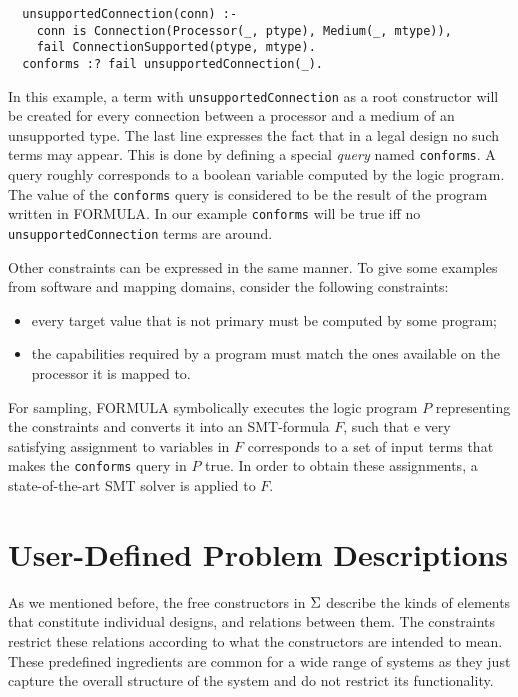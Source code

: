 \documentclass[conference]{IEEEtran}
\newcommand{\FORMULA}{FORMULA}%
\begin{document}
{\scriptsize\begin{verbatim}
  unsupportedConnection(conn) :- 
    conn is Connection(Processor(_, ptype), Medium(_, mtype)), 
    fail ConnectionSupported(ptype, mtype).
  conforms :? fail unsupportedConnection(_).
\end{verbatim}}

In this example, a term with \texttt{unsupportedConnection} as a root constructor will be created for every connection between a processor and a medium of an unsupported type. The last line expresses the fact that in a legal design no such terms may appear. This is done by defining a special \emph{query} named \texttt{conforms}. A query roughly corresponds to a boolean variable computed by the logic program. The value of the \texttt{conforms} query is considered to be the result of the program written in \FORMULA{}. In our example \texttt{conforms} will be true iff no  \texttt{unsupportedConnection} terms are around.

Other constraints can be expressed in the same manner. To give some examples from software and mapping domains, consider the following constraints:
\begin{itemize}
  \item every target value that is not primary must be computed by some program;
  \item the capabilities required by a program must match the ones available on the processor it is mapped to.
\end{itemize}

For sampling, \FORMULA{} symbolically executes the logic program $P$ representing the constraints and converts it into an SMT-formula $F$, such that e
very satisfying assignment to variables in $F$ corresponds to a set of input terms that makes the \texttt{conforms} query in $P$ true. In order to obtain these assignments, a state-of-the-art SMT solver is applied to $F$.

\section{User-Defined Problem Descriptions}

As we mentioned before, the free constructors in $\Sigma$ describe the kinds of elements that constitute individual designs, and relations between them. The constraints restrict these relations according to what the constructors are intended to mean. These predefined ingredients are common for a wide range of systems as they just capture the overall structure of the system and do not restrict its functionality. 
\end{document}
